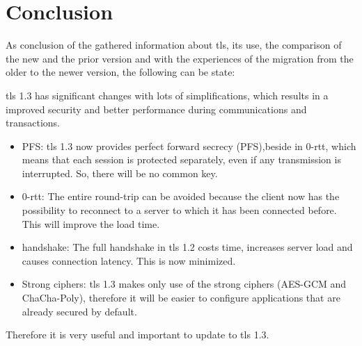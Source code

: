\chapter{Conclusion}
\label{chap:conclusion}

As conclusion of the gathered information about \gls{tls}, its use, the comparison of the new and the prior version and with the experiences of the migration from the older to the newer version, the following can be state:

\gls{tls} 1.3 has significant changes with lots of simplifications, which results in a improved security and better performance during communications and transactions. 
\begin{itemize}
   \item PFS: \gls{tls} 1.3 now provides perfect forward secrecy (PFS),beside in 0-\gls{rtt}, which means that each session is protected separately, even if any transmission is interrupted. So, there will be no common key. 

   \item 0-\gls{rtt}: The entire round-trip can be avoided because the client now has the possibility to reconnect to a server to which it has been connected before. This will improve the load time.

   \item handshake: The full handshake in \gls{tls} 1.2 costs time, increases server load and causes connection latency. This is now minimized.

   \item  Strong ciphers: \gls{tls} 1.3 makes only use of the strong ciphers (AES-GCM and ChaCha-Poly), therefore it will be easier to configure applications that are already secured by default.
\end{itemize}
Therefore it is very useful and important to update to \gls{tls} 1.3.


